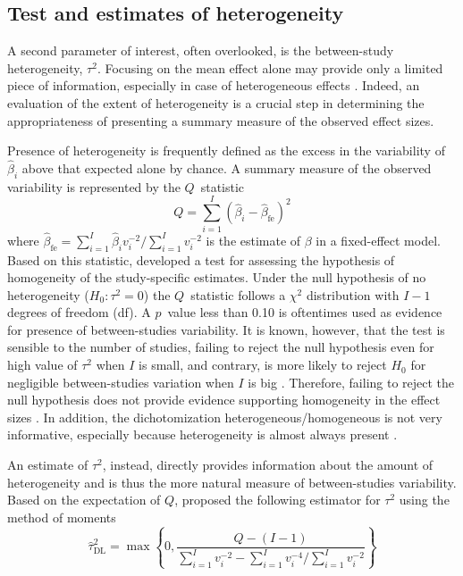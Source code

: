 \documentclass[11pt,a4paper,twoside,openany]{book}\usepackage{knitr}
\begin{document}
{\subsection{Test and estimates of heterogeneity}\label{sec:het_rma}

A second parameter of interest, often overlooked, is the between-study heterogeneity, $\tau^2$. Focusing on the mean effect alone may provide only a limited piece of information, especially in case of heterogeneous effects \citep{borenstein2010basic}. Indeed, an evaluation of the extent of heterogeneity is a crucial step in determining the appropriateness of presenting a summary measure of the observed effect sizes.

Presence of heterogeneity is frequently defined as the excess in the variability of $\hat \beta_i$ above that expected alone by chance. A summary measure of the observed variability is represented by the $Q$~statistic
\begin{equation}
Q = \sum_{i=1}^I \left(\hat \beta_i - \hat \beta_{\text{fe}} \right)^2
\label{eq:Q}
\end{equation}
\noindent where $\hat \beta_{\text{fe}} = \sum_{i=1}^I \hat \beta_i v_i^{-2}/ \sum_{i=1}^I v_i^{-2}$ is the estimate of $\beta$ in a fixed-effect model. Based on this statistic, \cite{cochran1954combination} developed a test for assessing the hypothesis of homogeneity of the study-specific estimates. Under the null hypothesis of no heterogeneity ($H_0: \tau^2 = 0$) the $Q$~statistic follows a $\chi^2$ distribution with $I-1$ degrees of freedom (df). A $p$~value less than 0.10 is oftentimes used as evidence for presence of between-studies variability. It is known, however, that the test is sensible to the number of studies, failing to reject the null hypothesis even for high value of $\tau^2$ when $I$ is small, and contrary, is more likely to reject $H_0$ for negligible between-studies variation when $I$ is big \citep{higgins2002quantifying, takkouche1999evaluation}. Therefore, failing to reject the null hypothesis does not provide evidence supporting homogeneity in the effect sizes \citep{biggerstaff1997incorporating}. In addition, the dichotomization heterogeneous/homogeneous is not very informative, especially because heterogeneity is almost always present \citep{higgins2008commentary}. 

An estimate of $\tau^2$, instead, directly provides information about the amount of heterogeneity and is thus the more natural measure of between-studies variability. Based on the expectation of $Q$, \cite{dersimonian1986meta} proposed the following estimator for $\tau^2$ using the method of moments 
\begin{equation}
\hat \tau^2_{\text{DL}} = \max \left\{0, \frac{Q - (I-1)}{\sum_{i=1}^I v_i^{-2} - \sum_{i=1}^I v_i^{-4}/\sum_{i=1}^I v_i^{-2} } \right\}
\label{eq:tau2DL}
\end{equation}

}
\end{document}
